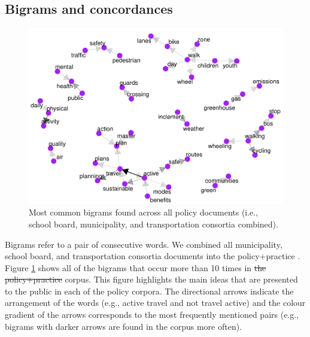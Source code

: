 \documentclass[preprint, 3p,
authoryear]{elsarticle} %
\providecommand{\DIFaddtex}[1]{{\protect\color{blue}\uwave{#1}}} %
\providecommand{\DIFdeltex}[1]{{\protect\color{red}\sout{#1}}}                      %
\providecommand{\DIFaddbegin}{} %
\providecommand{\DIFaddend}{} %
\providecommand{\DIFdelbegin}{} %
\providecommand{\DIFdelend}{} %
\providecommand{\DIFadd}[1]{\texorpdfstring{\DIFaddtex{#1}}{#1}} %
\providecommand{\DIFdel}[1]{\texorpdfstring{\DIFdeltex{#1}}{}} %
\newcommand{\DIFscaledelfig}{0.5}
\newlength{\DIFdelgraphicswidth} %
\newlength{\DIFdelgraphicsheight} %
\newcommand{\DIFaddincludegraphics}[2][]{{\color{blue}\fbox{\DIFOincludegraphics[#1]{#2}}}} %
\newcommand{\DIFdelincludegraphics}[2][]{%
\sbox{\DIFdelgraphicsbox}{\DIFOincludegraphics[#1]{#2}}%
\settoboxwidth{\DIFdelgraphicswidth}{\DIFdelgraphicsbox} %
\settoboxtotalheight{\DIFdelgraphicsheight}{\DIFdelgraphicsbox} %
\scalebox{\DIFscaledelfig}{%
\parbox[b]{\DIFdelgraphicswidth}{\usebox{\DIFdelgraphicsbox}\\[-\baselineskip] \rule{\DIFdelgraphicswidth}{0em}}\llap{\resizebox{\DIFdelgraphicswidth}{\DIFdelgraphicsheight}{%
\setlength{\unitlength}{\DIFdelgraphicswidth}%
\begin{picture}(1,1)%
\thicklines\linethickness{2pt} %
{\color[rgb]{1,0,0}\put(0,0){\framebox(1,1){}}}%
{\color[rgb]{1,0,0}\put(0,0){\line( 1,1){1}}}%
{\color[rgb]{1,0,0}\put(0,1){\line(1,-1){1}}}%
\end{picture}%
}\hspace*{3pt}}} %
} %
\DeclareRobustCommand{\DIFaddbegin}{\DIFOaddbegin \let\includegraphics\DIFaddincludegraphics} %
\DeclareRobustCommand{\DIFaddend}{\DIFOaddend \let\includegraphics\DIFOincludegraphics} %
\DeclareRobustCommand{\DIFdelbegin}{\DIFOdelbegin \let\includegraphics\DIFdelincludegraphics} %
\DeclareRobustCommand{\DIFdelend}{\DIFOaddend \let\includegraphics\DIFOincludegraphics} %
\begin{document}
\hypertarget{bigrams-and-concordances}{%
\subsection{Bigrams and concordances}\label{bigrams-and-concordances}}

\begin{figure}

{\centering \includegraphics[width=1\linewidth]{AST-Framing-Ontario_files/figure-latex/policy-visual-1} 

}

\caption{\label{fig:policy-visual}Most common bigrams found across all policy documents (i.e., school board, municipality, and transportation consortia combined).}\label{fig:policy-visual}
\end{figure}

Bigrams refer to a pair of consecutive words. We combined all
municipality, school board, and transportation consortia documents into
the policy+practice \DIFaddbegin \DIFadd{corpus}\DIFaddend . Figure \ref{fig:policy-visual} shows all of
the bigrams that occur more than 10 times in \DIFdelbegin \DIFdel{the policy+practice }\DIFdelend \DIFaddbegin \DIFadd{this }\DIFaddend corpus. This figure
highlights the main ideas that are presented to the public in each of
the policy corpora. The directional arrows indicate the arrangement of
the words (e.g., active travel and not travel active) and the colour
gradient of the arrows corresponds to the most frequently mentioned
pairs (e.g., bigrams with darker arrows are found in the corpus more
often).
\end{document}

